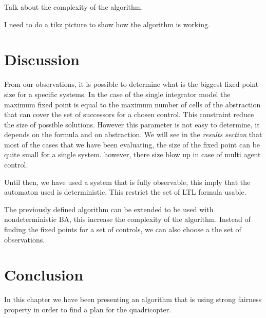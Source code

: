 Talk about the complexity of the algorithm.

I need to do a tikz picture to show how the algorithm is working.

\section{Discussion}
From our observations, it is possible to determine what is the biggest fixed point size for a specific systems.
In the case of the single integrator model the maximum fixed point is equal to the maximum number of cells of the abstraction that can cover the set of successors for a chosen control.
This constraint reduce the size of possible solutions.
However this parameter is not easy to determine, it depends on the formula and on abstraction.
We will see in the \textit{results section} that most of the cases that we have been evaluating, the size of the fixed point can be quite small for a single system. however, there size blow up in case of multi agent control.

Until then, we have used a system that is fully observable, this imply that the \buchi{} automaton used is deterministic.
This restrict the set of LTL formula usable. 

The previously defined algorithm can be extended to be used with nondeterministic BA, this increase the complexity of the algorithm. 
Instead of finding the fixed points for a set of controls, we can also choose a the set of observations.

\section{Conclusion}
In this chapter we have been presenting an algorithm that is using strong fairness property in order to find a plan for the quadricopter.